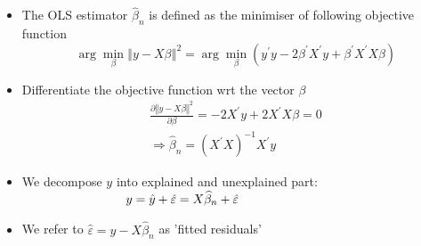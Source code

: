 \documentclass[notes=show]{beamer}
\begin{document}
\begin{frame}%

\begin{itemize}
\item The OLS estimator $\widehat{\beta }_{n}$ is defined as the minimiser
of following objective function%
\begin{equation*}
\arg \min_{\beta }\left\Vert y-X\beta \right\Vert ^{2}=\arg \min_{\beta
}(y^{\prime }y-2\beta ^{\prime }X^{\prime }y+\beta ^{\prime }X^{\prime
}X\beta )
\end{equation*}

\item Differentiate the objective function wrt the vector $\beta $%
\begin{gather*}
\frac{\partial \left\Vert y-X\beta \right\Vert ^{2}}{\partial \beta }%
=-2X^{\prime }y+2X^{\prime }X\beta =0 \\
\Rightarrow \widehat{\beta }_{n}=(X^{\prime }X)^{-1}X^{\prime }y
\end{gather*}

\item We decompose $y$ into explained and unexplained part: $\ \ \ \ \ \ \ \
\ \ \ \ \ \ \ \ \ \ \ \ \ \ \ \ \ y=\hat{y}+\hat{\varepsilon}=X\widehat{%
\beta }_{n}+\hat{\varepsilon}$

\item We refer to $\hat{\varepsilon}=y-X\widehat{\beta }_{n}$ as 'fitted
residuals'
\end{itemize}

\end{frame}%
\end{document}
